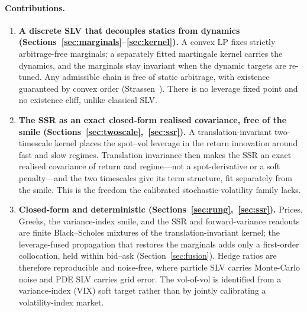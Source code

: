 \documentclass[11pt]{article}
\begin{document}
\paragraph{Contributions.}
\begin{enumerate}
  \item \textbf{A discrete SLV that decouples statics from dynamics
    (Sections~\ref{sec:marginals}--\ref{sec:kernel}).} A convex LP fixes strictly arbitrage-free
    marginals; a separately fitted martingale kernel carries the dynamics, and the marginals stay
    invariant when the dynamic targets are re-tuned. Any admissible chain is free of static arbitrage,
    with existence guaranteed by convex order (Strassen~\cite{strassen1965}). There is no leverage
    fixed point and no existence cliff, unlike classical SLV.
  \item \textbf{The SSR as an exact closed-form realised covariance, free of the smile
    (Sections~\ref{sec:twoscale},~\ref{sec:ssr}).} A translation-invariant two-timescale kernel places
    the spot--vol leverage in the return innovation around fast and slow regimes. Translation
    invariance then makes the SSR an exact realised covariance of return and regime---not a
    spot-derivative or a soft penalty---and the two timescales give its term structure, fit separately
    from the smile. This is the freedom the calibrated stochastic-volatility family lacks.
  \item \textbf{Closed-form and deterministic
    (Sections~\ref{sec:rung},~\ref{sec:ssr}).} Prices, Greeks, the variance-index smile, and the SSR
    and forward-variance readouts are finite Black--Scholes mixtures of the translation-invariant
    kernel; the leverage-fused propagation that restores the marginals adds only a first-order
    collocation, held within bid--ask (Section~\ref{sec:fusion}). Hedge ratios are therefore
    reproducible and noise-free, where particle SLV carries Monte-Carlo noise and PDE SLV carries grid
    error. The vol-of-vol is identified from a variance-index (VIX) soft target rather than by jointly
    calibrating a volatility-index market.
\end{enumerate}
\end{document}
